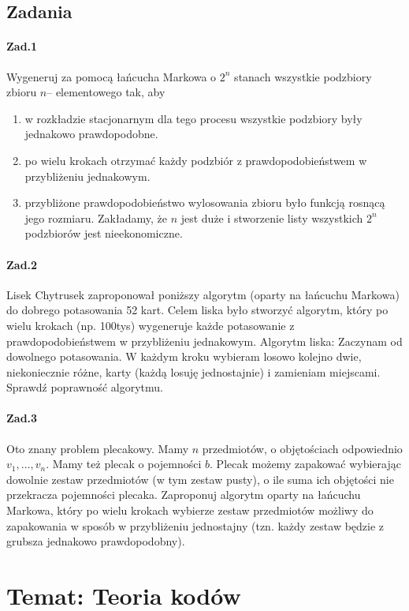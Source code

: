 \subsection{Zadania}
\paragraph{Zad.1} Wygeneruj za pomocą łańcucha Markowa o $2^n$ stanach wszystkie podzbiory zbioru $n$– elementowego tak, aby
\begin{enumerate}[label=\alph*)]
\item w rozkładzie stacjonarnym dla tego procesu wszystkie podzbiory były jednakowo prawdopodobne.
\item po wielu krokach otrzymać każdy podzbiór z prawdopodobieństwem w przybliżeniu jednakowym.
\item przybliżone prawdopodobieństwo wylosowania zbioru było funkcją rosnącą jego rozmiaru.
Zakładamy, że $n$ jest duże i stworzenie listy wszystkich $2^n$ podzbiorów jest nieekonomiczne.
\end{enumerate}

\paragraph{Zad.2} Lisek Chytrusek zaproponował poniższy algorytm (oparty na łańcuchu Markowa) do dobrego potasowania 52 kart. Celem liska było stworzyć algorytm, który po wielu krokach (np. 100tys) wygeneruje każde potasowanie z prawdopodobieństwem w przybliżeniu jednakowym. Algorytm liska: Zaczynam od dowolnego potasowania. W każdym kroku wybieram losowo kolejno dwie, niekoniecznie różne, karty (każdą losuję jednostajnie) i zamieniam miejscami. Sprawdź poprawność algorytmu.

\paragraph{Zad.3} Oto znany problem plecakowy. Mamy $n$ przedmiotów, o objętościach odpowiednio $v_1, . . . , v_n$. Mamy też plecak o pojemności $b$. Plecak możemy zapakować wybierając dowolnie zestaw przedmiotów (w tym zestaw pusty), o ile suma ich objętości nie przekracza pojemności plecaka. Zaproponuj algorytm oparty na łańcuchu Markowa, który po wielu krokach wybierze zestaw przedmiotów możliwy do zapakowania w sposób w przybliżeniu jednostajny (tzn. każdy zestaw będzie z grubsza jednakowo prawdopodobny).

\section[Wykład 10: 18-V-2017 - Temat: Teoria kodów]{Temat: Teoria kodów}
